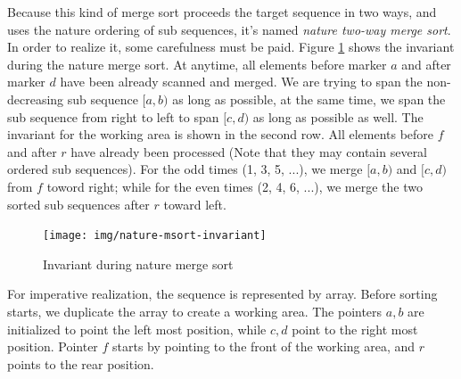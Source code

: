 \documentclass[b5paper]{article}
\begin{document}
Because this kind of merge sort proceeds the target sequence in two ways, and uses the
nature ordering of sub sequences, it's named {\em nature two-way merge sort}. In order
to realize it, some carefulness must be paid. Figure \ref{fig:nature-msort-invariant}
shows the invariant during the nature merge sort. At anytime, all elements before marker
$a$ and after marker $d$ have been already scanned and merged. We are trying to
span the non-decreasing sub sequence $[a, b)$ as long as possible, at the same time,
we span the sub sequence from right to left to span $[c, d)$ as long as possible as well.
The invariant for the working area is shown in the second row. All elements before
$f$ and after $r$ have already been processed (Note that they may contain several
ordered sub sequences). For the odd times (1, 3, 5, ...), we merge $[a, b)$ and $[c, d)$
from $f$ toword right; while for the even times (2, 4, 6, ...), we merge the two
sorted sub sequences after $r$ toward left.

\begin{figure}[htbp]
 \centering
 \texttt{[image: img/nature-msort-invariant]}
 \caption{Invariant during nature merge sort}
 \label{fig:nature-msort-invariant}
\end{figure}

For imperative realization, the sequence is represented by array. Before sorting starts,
we duplicate the array to create a working area. The pointers $a, b$ are initialized to
point the left most position, while $c, d$ point to the right most position. Pointer $f$
starts by pointing to the front of the working area, and $r$ points to the rear
position.
\end{document}
